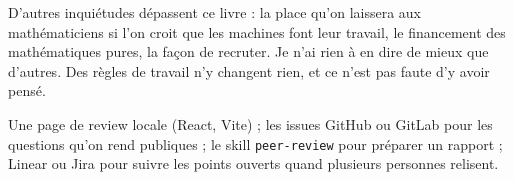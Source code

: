 D'autres inquiétudes dépassent ce livre : la place qu'on laissera aux mathématiciens si
l'on croit que les machines font leur travail, le financement des mathématiques pures, la
façon de recruter. Je n'ai rien à en dire de mieux que d'autres. Des règles de travail
n'y changent rien, et ce n'est pas faute d'y avoir pensé.

\begin{outils}
Une page de review locale (React, Vite) ; les issues GitHub ou GitLab pour les
questions qu'on rend publiques ; le skill \texttt{peer-review} pour préparer un rapport ;
Linear ou Jira pour suivre les points ouverts quand plusieurs personnes relisent.
\end{outils}
